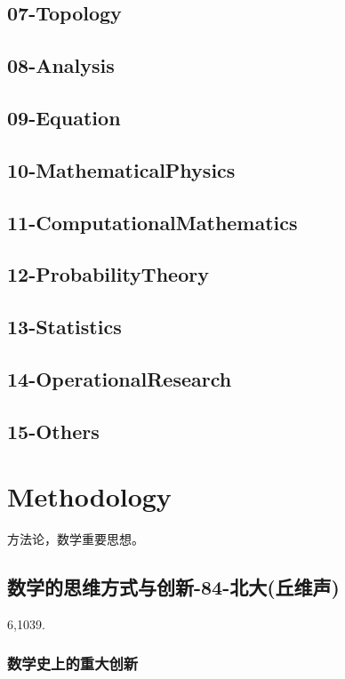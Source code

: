 \documentclass[UTF8]{../09-Mathematics}
\begin{document}
\section{07-Topology}
\section{08-Analysis}
\section{09-Equation}
\section{10-MathematicalPhysics}
\section{11-ComputationalMathematics}
\section{12-ProbabilityTheory}
\section{13-Statistics}
\section{14-OperationalResearch}
\section{15-Others}



\chapter{Methodology}
方法论，数学重要思想。





\section{数学的思维方式与创新-84-北大(丘维声)}
6,1039. 

\subsection{数学史上的重大创新}
\end{document}
